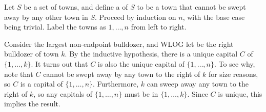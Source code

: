 Let $S$ be a set of towns, and define a  of $S$ to be a town that cannot be swept away by any other town in $S$. Proceed by induction on $n$, with the base case being trivial. Label the towns as $1,\dots,n$ from left to right.

Consider the largest non-endpoint bulldozer, and WLOG let be the right bulldozer of town $k$. By the inductive hypothesis, there is a unique capital $C$ of $\{1,\dots,k\}$. It turns out that $C$ is also the unique capital of $\{1,\dots,n\}$. To see why, note that $C$ cannot be swept away by any town to the right of $k$ for size reasons, so $C$ is a capital of $\{1,\dots,n\}$. Furthermore, $k$ can sweep away any town to the right of $k$, so any capitals of $\{1,\dots,n\}$ must be in $\{1,\dots,k\}$. Since $C$ is unique, this implies the result.
